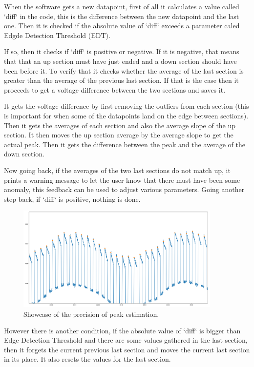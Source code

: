 \documentclass[a4paper, 10pt]{article}
\begin{document}
When the software gets a new datapoint, first of all it calculates a value called `diff` in the code, this is the difference between the new datapoint and the last one.
Then it is checked if the absolute value of `diff` exceeds a parameter caled Edgde Detection Threshold (EDT).

If so, then it checks if `diff` is positive or negative.
If it is negative, that means that that an up section must have just ended and a down section should have been before it.
To verify that it checks whether the average of the last section is greater than the average of the previous last section.
If that is the case then it proceeds to get a voltage difference between the two sections and saves it.

It gets the voltage difference by first removing the outliers from each section (this is important for when some of the datapoints land on the edge between sections).
Then it gets the averages of each section and also the average slope of the up section.
It then moves the up section average by the average slope to get the actual peak.
Then it gets the difference between the peak and the average of the down section.

Now going back, if the averages of the two last sections do not match up, it prints a warning message to let the user know that there must have been some anomaly, this feedback can be used to adjust various parameters.
Going another step back, if `diff` is positive, nothing is done.

\begin{figure}[H]
    \centering
    \includegraphics[width=0.9\textwidth]{./images/soft-spike-est.png}
    \caption{Showcase of the precision of peak estimation.}
    \label{fig:soft-spike-est}
\end{figure}

However there is another condition, if the absolute value of `diff` is bigger than Edge Detection Threshold and there are some values gathered in the last section, then it forgets the current previous last section and moves the current last section in its place.
It also resets the values for the last section.
\end{document}

